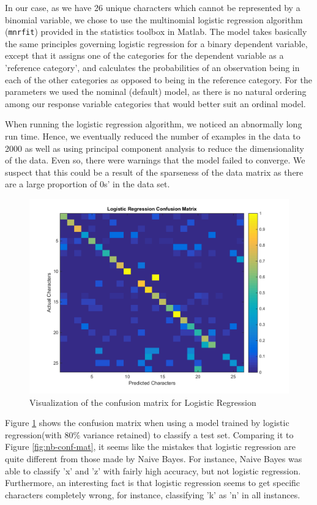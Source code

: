 \documentclass{article} %
\begin{document}
In our case, as we have 26 unique characters which cannot be represented by a binomial variable, we chose to use the multinomial logistic regression algorithm (\texttt{mnrfit}) provided in the statistics toolbox in Matlab. The model takes basically the same principles governing logistic regression for a binary dependent variable, except that it assigns one of the categories for the dependent variable as a 'reference category', and calculates the probabilities of an observation being in each of the other categories as opposed to being in the reference category. For the parameters we used the nominal (default) model, as there is no natural ordering among our response variable categories that would better suit an ordinal model.

When running the logistic regression algorithm, we noticed an abnormally long run time. Hence, we eventually reduced the number of examples in the data to 2000 as well as using principal component analysis to reduce the dimensionality of the data. Even so, there were warnings that the model failed to converge. We suspect that this could be a result of the sparseness of the data matrix as there are a large proportion of 0s' in the data set.

\begin{figure}[h]
\begin{center}
\includegraphics[scale=0.3]{confusion_lr.png}
\end{center}
\caption{Visualization of the confusion matrix for Logistic Regression}
\label{fig:lr-conf-mat}
\end{figure}

Figure \ref{fig:lr-conf-mat} shows the confusion matrix when using a model trained by logistic regression(with 80\% variance retained) to classify a test set. Comparing it to Figure \ref{fig:nb-conf-mat}, it seems like the mistakes that logistic regression are quite different from those made by Naive Bayes. For instance, Naive Bayes was able to classify 'x' and 'z' with fairly high accuracy, but not logistic regression. Furthermore, an interesting fact is that logistic regression seems to get specific characters completely wrong, for instance, classifying 'k' as 'n' in all instances.
\end{document}
